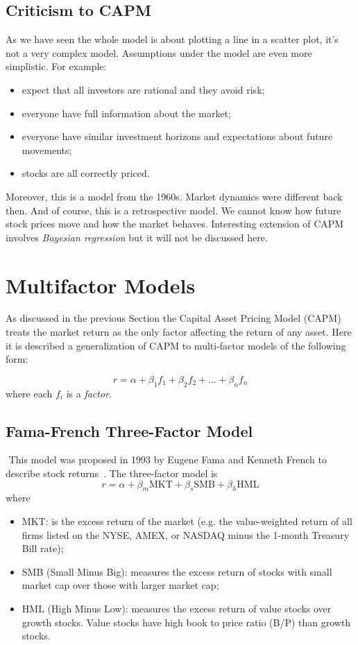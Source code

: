 \subsection{Criticism to CAPM}
As we have seen the whole model is about plotting a line in a scatter plot, it’s not a very complex model. Assumptions under the model are even more simplistic. For example:
\begin{itemize}
\tightlist
\item expect that all investors are rational and they avoid risk;
\item everyone have full information about the market;
\item everyone have similar investment horizons and expectations about future movements;
\item stocks are all correctly priced.
\end{itemize}

Moreover, this is a model from the 1960s. Market dynamics were different back then. And of course, this is a retrospective model. We cannot know how future stock prices move and how the market behaves.
Interesting extension of CAPM involves \emph{Bayesian regression}\cite{bib:bayesian_regression} but it will not be discussed here.

\section{Multifactor Models}
As discussed in the previous Section the Capital Asset Pricing Model (CAPM) treats the market return as the only factor affecting the return of any asset. Here it is described a generalization of CAPM to multi-factor models of the following form:

\begin{equation}
r=\alpha + \beta_1 f_1 + \beta_2 f_2 +\ldots + \beta_n f_n
\end{equation}
where each $f_i$ is a \emph{factor}.

\subsection{Fama-French Three-Factor Model}
﻿
This model was proposed in 1993 by Eugene Fama and Kenneth French to describe stock returns~\cite{bib:fama_french}. The three-factor model is
\begin{equation}
r=\alpha + \beta_m \textrm{MKT} +\beta_s \textrm{SMB}+ \beta_h \textrm{HML}
\end{equation}
where
\begin{itemize}
\tightlist
\item MKT: is the excess return of the market (e.g. the value-weighted return of all firms listed on the NYSE, AMEX, or NASDAQ minus the 1-month Treasury Bill rate);
\item SMB (Small Minus Big): measures the excess return of stocks with small market cap over those with larger market cap;
\item HML (High Minus Low): measures the excess return of value stocks over growth stocks. Value stocks have high book to price ratio (B/P) than growth stocks.
\end{itemize}

